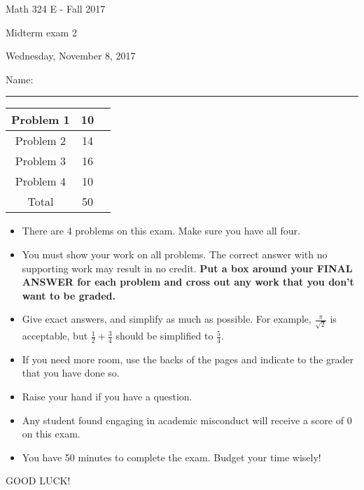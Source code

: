 \documentclass[12 pt]{report}
\begin{document}
\noindent \vfill \noindent \large

\centerline{Math 324 E  - Fall 2017}

\centerline{Midterm exam 2}

\centerline{Wednesday, November 8, 2017}

\normalsize

\vfill
\medskip
Name: \rule{10cm}{1pt}

\bigskip

\vfill
\begin{center}
{\large
\begin{tabular}{||c|c|r||}
\hline Problem 1 & 10 & \hspace{10mm} \hfill \\
\hline Problem 2 & 14 & \hspace{10mm} \hfill \\
\hline Problem 3 & 16 & \hspace{10mm} \hfill \\
\hline Problem 4 & 10  & \hspace{10mm} \hfill \\
\hline Total & 50 & \hspace{10mm} \hfill \\
\hline
\end{tabular}
}
\end{center}
\vfill
\begin{itemize}
\item There are 4 problems on this exam. Make sure you have all four.
\item You must show your work on all problems.  The correct answer
with no supporting work may result in no credit. \textbf{Put a box
around your FINAL ANSWER for each problem and cross out any work
that you don't want to be graded.} 
\item Give exact answers, and simplify as much as possible. 
For example, $\frac{\pi}{\sqrt{2}}$ is acceptable, but $\frac{1}{2} + \frac{3}{4}$
should be simplified to $\frac{5}{4}$.   

\item If you need more room, use the backs
of the pages and indicate to the grader that you have done so.
\item Raise your hand if you have a question.
\item Any student found engaging in academic misconduct will receive
a score of 0 on this exam.
\item You have 50 minutes to complete the exam.  Budget your time wisely! \\
\end{itemize}
\vfill
\begin{center}GOOD LUCK!\end{center}
\end{document}
